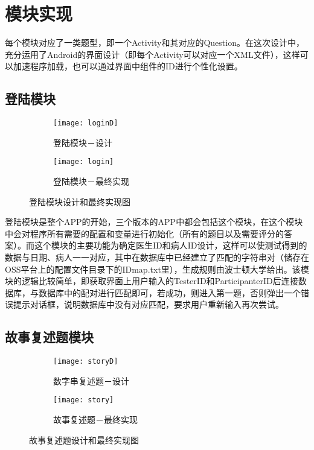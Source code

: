 

\chapter{模块实现}

每个模块对应了一类题型，即一个Activity和其对应的Question。在这次设计中，充分运用了Android的界面设计（即每个Activity可以对应一个XML文件），这样可以加速程序加载，也可以通过界面中组件的ID进行个性化设置。

\section{登陆模块}

\begin{figure}[h]
\centering%
\begin{subfigure}{6cm}
\texttt{[image: loginD]}
\caption{登陆模块－设计}
\end{subfigure}
\hspace{4em}%
\begin{subfigure}{6cm}
\texttt{[image: login]}
\caption{登陆模块－最终实现}
\end{subfigure}
\caption{登陆模块设计和最终实现图}
\label{fig:big1-subfigure}
\end{figure}

登陆模块是整个APP的开始，三个版本的APP中都会包括这个模块，在这个模块中会对程序所有需要的配置和变量进行初始化（所有的题目以及需要评分的答案）。而这个模块的主要功能为确定医生ID和病人ID设计，这样可以使测试得到的数据与日期、病人一一对应，其中在数据库中已经建立了匹配的字符串对（储存在OSS平台上的配置文件目录下的IDmap.txt里），生成规则由波士顿大学给出。该模块的逻辑比较简单，即获取界面上用户输入的TesterID和ParticipanterID后连接数据库，与数据库中的配对进行匹配即可，若成功，则进入第一题，否则弹出一个错误提示对话框，说明数据库中没有对应匹配，要求用户重新输入再次尝试。

\section{故事复述题模块}

\begin{figure}[h]
\centering%
\begin{subfigure}{6cm}
\texttt{[image: storyD]}
\caption{数字串复述题－设计}
\end{subfigure}
\hspace{4em}%
\begin{subfigure}{6cm}
\texttt{[image: story]}
\caption{故事复述题－最终实现}
\end{subfigure}
\caption{故事复述题设计和最终实现图}
\label{fig:big1-subfigure}
\end{figure}

